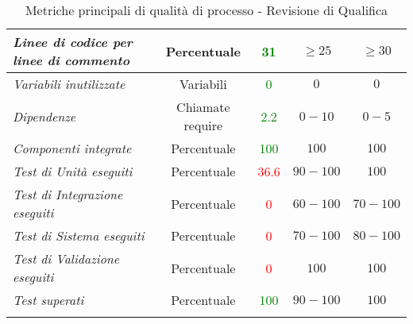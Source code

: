 \begin{longtable}{|>{\centering}m{5cm}|c|c|c|c|}
\emph{Linee di codice per linee di commento} & {Percentuale} & \textcolor{Green}{31} & $\geq 25$ & $\geq 30$\\ \hline
\emph{Variabili inutilizzate} & {Variabili} & \textcolor{Green}{0} & $0$ & $0$\\ \hline
\emph{Dipendenze} & {Chiamate require} & \textcolor{Green}{2.2} & $0 - 10$ & $0 - 5$\\ \hline
\emph{Componenti integrate} & {Percentuale} & \textcolor{Green}{100} & $100$ & $100$\\ \hline
\emph{Test di Unità eseguiti} & {Percentuale} & \textcolor{Red}{36.6} & $90 - 100$ & $100$\\ \hline
\emph{Test di Integrazione eseguiti} & {Percentuale} & \textcolor{Red}{0} & $60 - 100$ & $70 - 100$\\ \hline
\emph{Test di Sistema eseguiti} & {Percentuale} & \textcolor{Red}{0} & $70 - 100$ & $80 - 100$\\ \hline
\emph{Test di Validazione eseguiti} & {Percentuale} & \textcolor{Red}{0} & $100$ & $100$\\ \hline
\emph{Test superati} & {Percentuale} & \textcolor{Green}{100} & $90 - 100$ & $100$\\ \hline
\caption{Metriche principali di qualità di processo - Revisione di Qualifica}
\end{longtable}

\newpage
